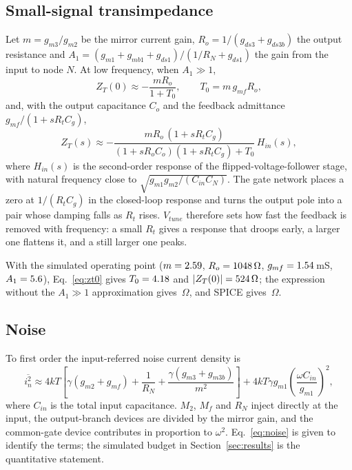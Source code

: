\documentclass[11pt,a4paper]{article}
\begin{document}
\subsection{Small-signal transimpedance}
Let $m=g_{m3}/g_{m2}$ be the mirror current gain, $R_o=1/(g_{ds3}+g_{ds3b})$ the output resistance and $A_1=(g_{m1}+g_{mb1}+g_{ds1})/(1/R_N+g_{ds1})$ the gain from the input to node $N$. At low frequency, when $A_1\gg 1$,
\begin{equation}
Z_T(0)\approx-\frac{mR_o}{1+T_0},\qquad T_0=m\,g_{mf}R_o ,
\label{eq:zt0}
\end{equation}
and, with the output capacitance $C_o$ and the feedback admittance $g_{mf}/(1+sR_tC_g)$,
\begin{equation}
Z_T(s)\approx-\frac{mR_o\,(1+sR_tC_g)}{(1+sR_oC_o)(1+sR_tC_g)+T_0}\,H_{in}(s),
\label{eq:zt}
\end{equation}
where $H_{in}(s)$ is the second-order response of the flipped-voltage-follower stage, with natural frequency close to $\sqrt{g_{m1}g_{m2}/(C_{in}C_N)}$. The gate network places a zero at $1/(R_tC_g)$ in the closed-loop response and turns the output pole into a pair whose damping falls as $R_t$ rises. $V_{tune}$ therefore sets how fast the feedback is removed with frequency: a small $R_t$ gives a response that droops early, a larger one flattens it, and a still larger one peaks.

With the simulated operating point ($m=2.59$, $R_o=1048\,\Omega$, $g_{mf}=1.54$\,mS, $A_1=5.6$), Eq.~\eqref{eq:zt0} gives $T_0=4.18$ and $|Z_T(0)|=524\,\Omega$; the expression without the $A_1\gg1$ approximation gives \ZtExact\,$\Omega$, and SPICE gives \PZtOhm\,$\Omega$.

\subsection{Noise}
To first order the input-referred noise current density is
\begin{equation}
\overline{i_{n}^2}\approx 4kT\left[\gamma\left(g_{m2}+g_{mf}\right)+\frac{1}{R_N}+\frac{\gamma\left(g_{m3}+g_{m3b}\right)}{m^2}\right]+4kT\gamma g_{m1}\left(\frac{\omega C_{in}}{g_{m1}}\right)^2 ,
\label{eq:noise}
\end{equation}
where $C_{in}$ is the total input capacitance. $M_2$, $M_f$ and $R_N$ inject directly at the input, the output-branch devices are divided by the mirror gain, and the common-gate device contributes in proportion to $\omega^2$. Eq.~\eqref{eq:noise} is given to identify the terms; the simulated budget in Section~\ref{sec:results} is the quantitative statement.
\end{document}
